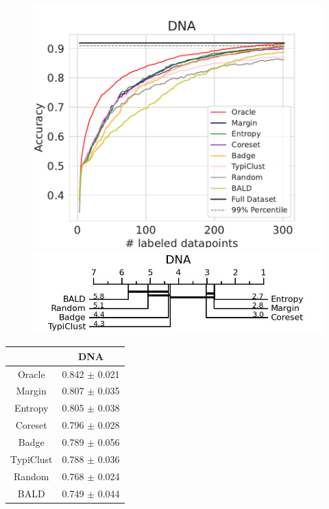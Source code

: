 \documentclass[]{article}
\begin{document}
\begin{minipage}{0.65\linewidth}
\begin{figure}[H]
    \centering
	\includegraphics[width=\linewidth]{img/eval_dna} \\ [2mm]
        \includegraphics[width=\linewidth]{img/micro_dna.jpg}
\end{figure}
\end{minipage}
\begin{minipage}{0.29\linewidth}
\begin{tabular}{c|c}
&DNA \\
\hline
Oracle&0.842 $\pm$ 0.021\\
Margin&0.807 $\pm$ 0.035\\
Entropy&0.805 $\pm$ 0.038\\
Coreset&0.796 $\pm$ 0.028\\
Badge&0.789 $\pm$ 0.056\\
TypiClust&0.788 $\pm$ 0.036\\
Random&0.768 $\pm$ 0.024\\
BALD&0.749 $\pm$ 0.044\\
\end{tabular}
\end{minipage}
\end{document}

